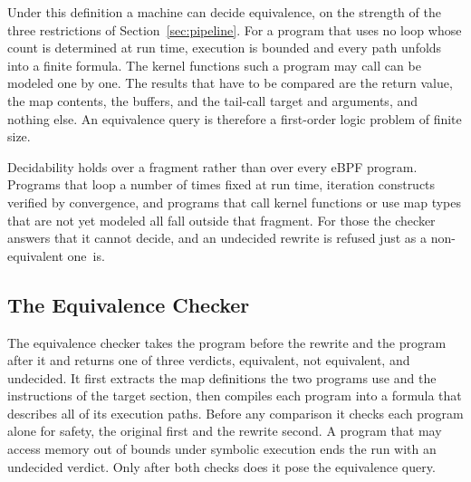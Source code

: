Under this definition a machine can decide equivalence, on the strength of the three restrictions of Section~\ref{sec:pipeline}.
For a program that uses no loop whose count is determined at run time, execution is bounded and every path unfolds into a finite formula.
The kernel functions such a program may call can be modeled one by one.
The results that have to be compared are the return value, the map contents, the buffers, and the tail-call target and arguments, and nothing else.
An equivalence query is therefore a first-order logic problem of finite size.

Decidability holds over a fragment rather than over every eBPF program.
Programs that loop a number of times fixed at run time, iteration constructs verified by convergence, and programs that call kernel functions or use map types that are not yet modeled all fall outside that fragment.
For those the checker answers that it cannot decide, and an undecided rewrite is refused just as a non-equivalent one~is.

\subsection{The Equivalence Checker}\label{sec:checker}

The equivalence checker takes the program before the rewrite and the program after it and returns one of three verdicts, equivalent, not equivalent, and undecided.
It first extracts the map definitions the two programs use and the instructions of the target section, then compiles each program into a formula that describes all of its execution paths.
Before any comparison it checks each program alone for safety, the original first and the rewrite second.
A program that may access memory out of bounds under symbolic execution ends the run with an undecided verdict.
Only after both checks does it pose the equivalence query.

